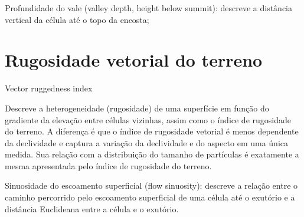 \documentclass[]{book}
\begin{document}
Profundidade do vale (valley depth, height below summit): descreve a
distância vertical da célula até o topo da encosta;

\section{Rugosidade vetorial do
terreno}\label{rugosidade-vetorial-do-terreno}

Vector ruggedness index

Descreve a heterogeneidade (rugosidade) de uma superfície em função do
gradiente da elevação entre células vizinhas, assim como o índice de
rugosidade do terreno. A diferença é que o índice de rugosidade vetorial
é menos dependente da declividade e captura a variação da declividade e
do aspecto em uma única medida. Sua relação com a distribuição do
tamanho de partículas é exatamente a mesma apresentada pelo índice de
rugosidade do terreno.

Sinuosidade do escoamento superﬁcial (ﬂow sinuosity): descreve a relação
entre o caminho percorrido pelo escoamento superﬁcial de uma célula até
o exutório e a distância Euclideana entre a célula e o exutório.


\end{document}
